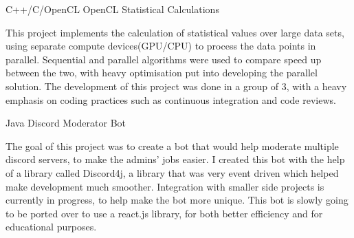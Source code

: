 
\begin{cventries}
\cventry
    {C++/C/OpenCL}
    {OpenCL Statistical Calculations}
    {}
    {}
    {
      \begin{cvitems}
        \item {This project implements the calculation of statistical values over large data sets, using separate compute devices(GPU/CPU) to process the data points in parallel. Sequential and parallel algorithms were used to compare speed up between the two, with heavy optimisation put into developing the parallel solution. The development of this project was done in a group of 3, with a heavy emphasis on coding practices such as continuous integration and code reviews. }
      \end{cvitems}
    }
  \cventry
    {Java}
    {Discord Moderator Bot}
    {}
    {}
    {
      \begin{cvitems}
        \item {The goal of this project was to create a bot that would help moderate multiple discord servers, to make the admins' jobs easier. I created this bot with the help of a library called Discord4j, a library that was very event driven which helped make development much smoother. Integration with smaller side projects is currently in progress, to help make the bot more unique. This bot is slowly going to be ported over to use a react.js library, for both better efficiency and for educational purposes.}
      \end{cvitems}
    }
\end{cventries}
\vspace{-5pt}